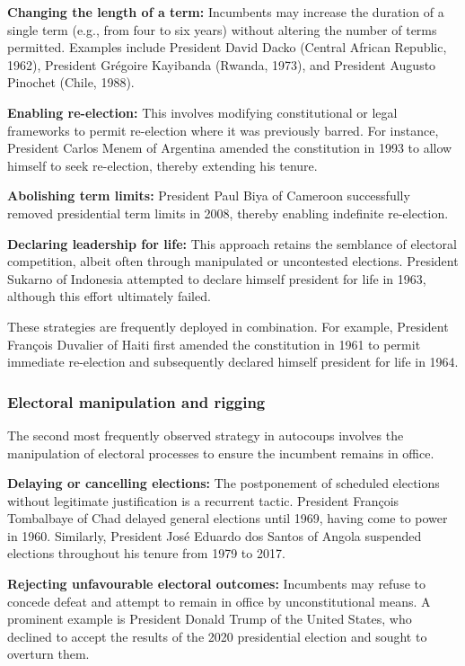 \documentclass[
  12pt,
]{report}
\begin{document}
\textbf{Changing the length of a term:} Incumbents may increase the
duration of a single term (e.g., from four to six years) without
altering the number of terms permitted. Examples include President David
Dacko (Central African Republic, 1962), President Grégoire Kayibanda
(Rwanda, 1973), and President Augusto Pinochet (Chile, 1988).

\textbf{Enabling re-election:} This involves modifying constitutional or
legal frameworks to permit re-election where it was previously barred.
For instance, President Carlos Menem of Argentina amended the
constitution in 1993 to allow himself to seek re-election, thereby
extending his tenure.

\textbf{Abolishing term limits:} President Paul Biya of Cameroon
successfully removed presidential term limits in 2008, thereby enabling
indefinite re-election.

\textbf{Declaring leadership for life:} This approach retains the
semblance of electoral competition, albeit often through manipulated or
uncontested elections. President Sukarno of Indonesia attempted to
declare himself president for life in 1963, although this effort
ultimately failed.

These strategies are frequently deployed in combination. For example,
President François Duvalier of Haiti first amended the constitution in
1961 to permit immediate re-election and subsequently declared himself
president for life in 1964.

\subsubsection*{Electoral manipulation and
rigging}\label{electoral-manipulation-and-rigging}

The second most frequently observed strategy in autocoups involves the
manipulation of electoral processes to ensure the incumbent remains in
office.

\textbf{Delaying or cancelling elections:} The postponement of scheduled
elections without legitimate justification is a recurrent tactic.
President François Tombalbaye of Chad delayed general elections until
1969, having come to power in 1960. Similarly, President José Eduardo
dos Santos of Angola suspended elections throughout his tenure from 1979
to 2017.

\textbf{Rejecting unfavourable electoral outcomes:} Incumbents may
refuse to concede defeat and attempt to remain in office by
unconstitutional means. A prominent example is President Donald Trump of
the United States, who declined to accept the results of the 2020
presidential election and sought to overturn them.
\end{document}
